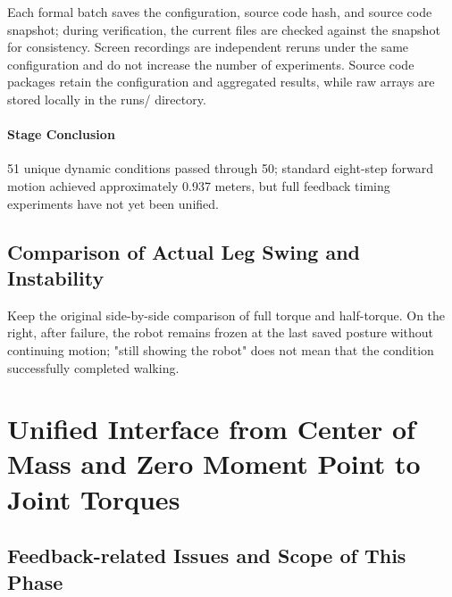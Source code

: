 Each formal batch saves the configuration, source code hash, and source code snapshot; during verification, the current files are checked against the snapshot for consistency. Screen recordings are independent reruns under the same configuration and do not increase the number of experiments. Source code packages retain the configuration and aggregated results, while raw arrays are stored locally in the runs/ directory.


\paragraph{Stage Conclusion} 51 unique dynamic conditions passed through 50; standard eight-step forward motion achieved approximately 0.937 meters, but full feedback timing experiments have not yet been unified.



\subsection{Comparison of Actual Leg Swing and Instability}
Keep the original side-by-side comparison of full torque and half-torque. On the right, after failure, the robot remains frozen at the last saved posture without continuing motion; "still showing the robot" does not mean that the condition successfully completed walking.



\FloatBarrier

\section{Unified Interface from Center of Mass and Zero Moment Point to Joint Torques}

\label{stage:s22}

\subsection{Feedback-related Issues and Scope of This Phase}\label{s22-detail-1}

